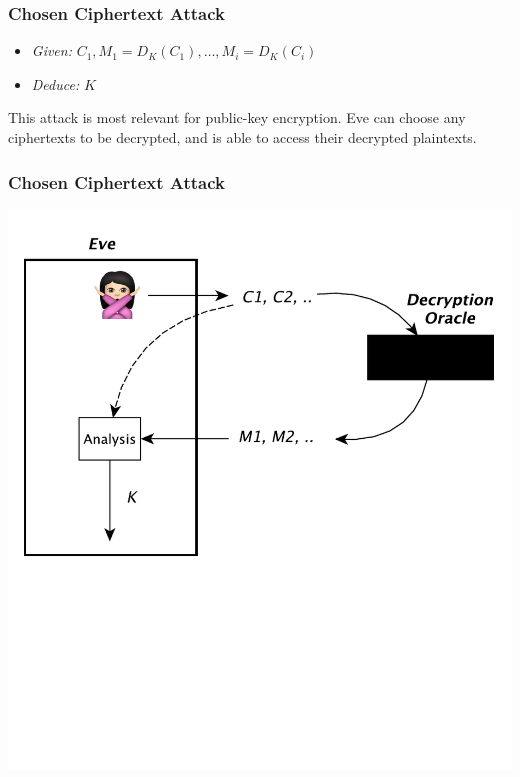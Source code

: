 \documentclass{beamer}
\newcommand{\<}{\langle}
\renewcommand{\>}{\rangle}
\begin{document}
\begin{frame}
\frametitle{Chosen Ciphertext Attack}

\begin{itemize}
\item \emph{Given:} $C_1, M_1 = D_K(C_1), \dots, M_i = D_K(C_i)$
\item \emph{Deduce:} $K$
\end{itemize}

This attack is most relevant for public-key encryption. Eve can choose any ciphertexts to be decrypted, and is able to access their decrypted plaintexts. 
\end{frame}

\begin{frame}
\frametitle{Chosen Ciphertext Attack}
\centering
\includegraphics[scale=.5]{IMG/attack4.pdf}
\end{frame}
\end{document}
